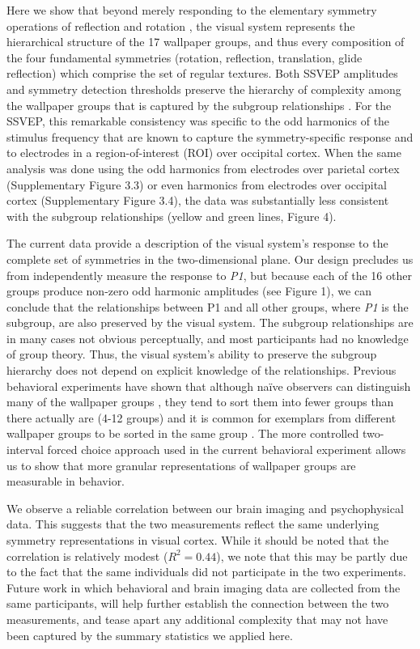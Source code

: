 \documentclass[9pt,twocolumn,twoside,lineno]{pnas-new}
\begin{document}
Here we show that beyond merely responding to the elementary symmetry operations of reflection \cite{RN1170} and rotation \cite{RN1725}, the visual system represents the hierarchical structure of the 17 wallpaper groups, and thus every composition of the four fundamental symmetries (rotation, reflection, translation, glide reflection) which comprise the set of regular textures. Both SSVEP amplitudes and symmetry detection thresholds preserve the hierarchy of complexity among the wallpaper groups that is captured by the subgroup relationships \cite{RN1711}. For the SSVEP, this remarkable consistency was specific to the odd harmonics of the stimulus frequency that are known to capture the symmetry-specific response \cite{RN1725} and to electrodes in a region-of-interest (ROI) over occipital cortex. When the same analysis was done using the odd harmonics from electrodes over parietal cortex (Supplementary Figure 3.3) or even harmonics from electrodes over occipital cortex (Supplementary Figure 3.4), the data was substantially less consistent with the subgroup relationships (yellow and green lines, Figure 4). 

The current data provide a description of the visual system’s response to the complete set of symmetries in the two-dimensional plane. Our design precludes us from independently measure the response to \textit{P1}, but because each of the 16 other groups produce non-zero odd harmonic amplitudes (see Figure 1), we can conclude that the relationships between P1 and all other groups, where \textit{P1} is the subgroup, are also preserved by the visual system. The subgroup relationships are in many cases not obvious perceptually, and most participants had no knowledge of group theory. Thus, the visual system’s ability to preserve the subgroup hierarchy does not depend on explicit knowledge of the relationships. Previous behavioral experiments have shown that although naïve observers can distinguish many of the wallpaper groups \cite{RN1253}, they tend to sort them into fewer groups than there actually are (4-12 groups) and it is common for exemplars from different wallpaper groups to be sorted in the same group \cite{RN172}. The more controlled two-interval forced choice approach used in the current behavioral experiment allows us to show that more granular representations of wallpaper groups are measurable in behavior. 

We observe a reliable correlation between our brain imaging and psychophysical data. This suggests that the two measurements reflect the same underlying symmetry representations in visual cortex. While it should be noted that the correlation is relatively modest ($R^2 = 0.44$), we note that this may be partly due to the fact that the same individuals did not participate in the two experiments. Future work in which behavioral and brain imaging data are collected from the same participants, will help further establish the connection between the two measurements, and tease apart any additional complexity that may not have been captured by the summary statistics we applied here. 
\end{document}
